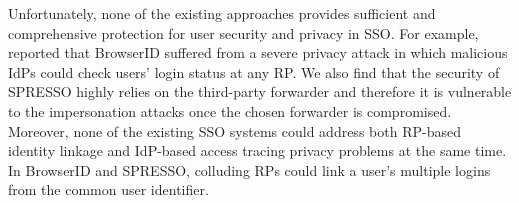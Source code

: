 


Unfortunately, none of the existing approaches provides sufficient and comprehensive protection for user security and privacy in SSO. For example, \cite{BrowserID} reported that BrowserID suffered from a severe privacy attack in which malicious IdPs could check users' login status at any RP. We also find that the security of SPRESSO highly relies on the third-party forwarder and therefore it is vulnerable to the impersonation attacks once the chosen forwarder is compromised.
Moreover, none of the existing SSO systems could address both RP-based identity linkage and IdP-based access tracing privacy problems at the same time. In BrowserID and SPRESSO, colluding RPs could link a user's multiple logins from the common user identifier.


